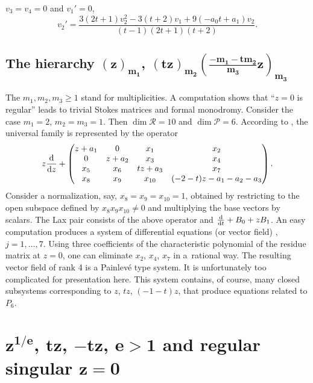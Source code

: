 \documentclass[10pt,a4paper]{amsart}
\numberwithin{equation}{section}
\begin{document}
\begin{Example}
 $v_3=v_4=0$ and $v_1'=0$, \[
 v_2'=\frac{3(2t+1)v_2^2-3(t+2)v_1+9(-a_0t+a_1)v_2}{(t-1)(2t+1)(t+2)}.
 \]
\end{Example}

\subsection[The hierarchy z-sub(m1), (tz)-sub(m2), ((-m1-tm2)z/m3(-sub(m3)]{The hierarchy $\boldsymbol{(z)_{m_1}}$, $\boldsymbol{(tz)_{m_2} (\frac{-m_1-tm_2}{m_3}z)_{m_3}}$}

The $m_1,m_2,m_3\geq 1$ stand for multiplicities. A computation shows that ``$z=0$ is regular'' leads to trivial Stokes matrices and
formal monodromy. Consider the case $m_1=2$, $m_2=m_3=1$. Then $\dim \mathcal{R} =10$ and $\dim \mathcal{P}=6$.
According to \cite[Exercise~12.5, p.~300]{vdP-Si}, the universal family is represented by the operator
\[z\frac{{\rm d}}{{\rm d}z} +
\begin{pmatrix} z+a_1 &0 & x_1&x_2 \\ 0 &z+a_2 & x_3&x_4 \\ x_5& x_6& tz+a_3&x_7 \\ x_8&x_9 &x_{10} & (-2-t)z-a_1-a_2-a_3\end{pmatrix} .\]
 Consider a normalization, say, $x_8=x_9=x_{10}=1$, obtained by restricting to the open subspace defined by $x_8x_9x_{10}\neq 0$
and multiplying the base vectors by scalars. The Lax pair consists of the above operator and $\frac{{\rm d}}{{\rm d}t}+B_0+zB_1$.
An easy computation produces a system of differential equations (or vector field)
 , $ j=1,\dots, 7$. Using three coefficients of the characteristic polynomial of the residue matrix at $z=0$, one can eliminate $x_2$, $x_4$, $x_7$ in a~rational way.
The resulting vector field of rank 4 is a Painlev\'e type system. It is unfortunately too complicated for presentation here.
This system contains, of course, many closed subsystems corresponding to $z$, $tz$, $(-1-t)z$, that produce
equations related to $P_6$.

\section[e-th root of z, tz, -tz for e at least 2 and regular singular z=0]{$\boldsymbol{z^{1/e}}$, $\boldsymbol{tz}$, $\boldsymbol{-tz}$, $\boldsymbol{e>1}$ and regular singular $\boldsymbol{z=0}$}\label{sec9}
\end{document}
